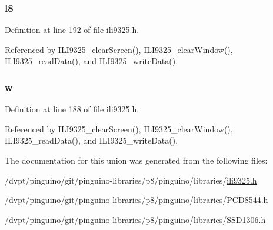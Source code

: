 \hypertarget{unionword__t_a533455d8a4ec318e7144be4c1b6b9af3}{
\subsubsection[{l8}]{ l8}}\label{unionword__t_a533455d8a4ec318e7144be4c1b6b9af3}


Definition at line 192 of file ili9325.\-h.



Referenced by I\-L\-I9325\-\_\-clear\-Screen(), I\-L\-I9325\-\_\-clear\-Window(), I\-L\-I9325\-\_\-read\-Data(), and I\-L\-I9325\-\_\-write\-Data().

\hypertarget{unionword__t_afba0181b8edd2f6d8219d7042ffc8a35}{
\subsubsection[{w}]{ w}}\label{unionword__t_afba0181b8edd2f6d8219d7042ffc8a35}


Definition at line 188 of file ili9325.\-h.



Referenced by I\-L\-I9325\-\_\-clear\-Screen(), I\-L\-I9325\-\_\-clear\-Window(), I\-L\-I9325\-\_\-read\-Data(), and I\-L\-I9325\-\_\-write\-Data().



The documentation for this union was generated from the following files\-:\begin{DoxyCompactItemize}
\item 
/dvpt/pinguino/git/pinguino-\/libraries/p8/pinguino/libraries/\hyperlink{ili9325_8h}{ili9325.\-h}\item 
/dvpt/pinguino/git/pinguino-\/libraries/p8/pinguino/libraries/\hyperlink{p8_2pinguino_2libraries_2_p_c_d8544_8h}{P\-C\-D8544.\-h}\item 
/dvpt/pinguino/git/pinguino-\/libraries/p8/pinguino/libraries/\hyperlink{p8_2pinguino_2libraries_2_s_s_d1306_8h}{S\-S\-D1306.\-h}\end{DoxyCompactItemize}
